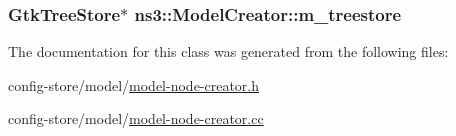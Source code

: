\subsubsection[{\texorpdfstring{m\+\_\+treestore}{m_treestore}}]{\setlength{\rightskip}{0pt plus 5cm}Gtk\+Tree\+Store$\ast$ ns3\+::\+Model\+Creator\+::m\+\_\+treestore\hspace{0.3cm}{\ttfamily [private]}}\hypertarget{classns3_1_1ModelCreator_a0903f3935532f3a9bcad426e7c0d9c73}{}\label{classns3_1_1ModelCreator_a0903f3935532f3a9bcad426e7c0d9c73}


The documentation for this class was generated from the following files\+:\begin{DoxyCompactItemize}
\item 
config-\/store/model/\hyperlink{model-node-creator_8h}{model-\/node-\/creator.\+h}\item 
config-\/store/model/\hyperlink{model-node-creator_8cc}{model-\/node-\/creator.\+cc}\end{DoxyCompactItemize}
